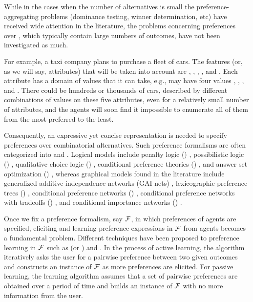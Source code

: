 While in the cases when the
number of alternatives is small the preference-aggregating 
problems (dominance testing, winner determination,
etc) have received wide attention in the literature,
the problems concerning preferences over , which typically contain large numbers of outcomes, 
have not been investigated as much.

For example, a taxi company plans to purchase a fleet of cars.
The features (or, as we will say, attributes) that will be
taken into account are , ,
, , and .  
Each attribute has a domain of values that it can take, e.g.,
 may have four values , , , and .
There could be hundreds or thousands of cars,
described by different combinations of values on these five attributes, 
even for a relatively small number of attributes, and
the agents will soon find it impossible to enumerate all of
them from the most preferred to the least.

Consequently, an expressive yet concise representation is needed to specify
preferences over combinatorial alternatives.
Such preference formalisms are often categorized into  and
.
Logical models include penalty logic () \cite{haddawy1992representations}, 
possibilistic logic () \cite{DuboisLP91},
qualitative choice logic () \cite{brewka2004qualitative},
conditional preference theories () \cite{Wilson04extendingcp-nets},
and answer set optimization () \cite{Brewka:ASO},
whereas graphical models found in the literature include
generalized additive independence networks (GAI-nets) \cite{BacchusG95,LIP61766},
lexicographic preference trees () \cite{booth:learningLP,conf/adt13/LiuT},
conditional preference networks () \cite{Kaci:Pref},
conditional preference networks with tradeoffs () \cite{BrafmanD02:TCP},
and conditional importance networks () \cite{Kaci:Pref}.

Once we fix a preference formalism, say $\mathcal{F}$, in which preferences of agents
are specified, eliciting and learning preference expressions in $\mathcal{F}$ from agents
becomes a fundamental problem.
Different techniques have been proposed to preference learning
in $\mathcal{F}$
such as  (or ) and 
 \cite{Furnkranz:pref_learning}.
In the process of
active learning, the algorithm iteratively asks the user for a pairwise 
preference between two given outcomes and constructs
an instance of $\mathcal{F}$ as more preferences are elicited.
For passive learning, the learning algorithm assumes that a set of
pairwise preferences are obtained over a period of time and builds an instance
of $\mathcal{F}$ with no more information from the user.

